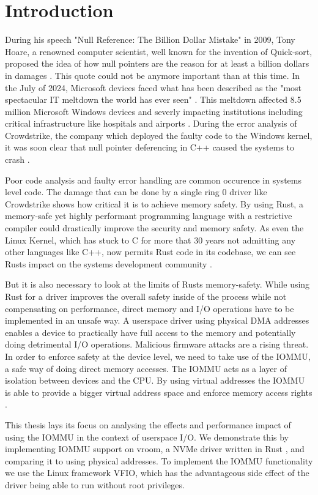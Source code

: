 \chapter{Introduction}\label{c:introduction}

During his speech "Null Reference: The Billion Dollar Mistake" in 2009, Tony Hoare, a renowned computer scientist, well known for the invention of Quick-sort, proposed the idea of how null pointers are the reason for at least a billion dollars in damages \cite{billiondollarmistake}. This quote could not be anymore important than at this time. In the July of 2024, Microsoft devices faced what has been described as the "most spectacular IT meltdown the world has ever seen" \cite{bloombergmeltdown}. This meltdown affected 8.5 million Microsoft Windows devices and severly impacting institutions including critical infrastructure like hospitals and airports \cite{bloomberg8milliondevices}. During the error analysis of Crowdstrike, the company which deployed the faulty code to the Windows kernel, it was soon clear that null pointer deferencing in C++ caused the systems to crash \cite{heisenullpointer}.

Poor code analysis and faulty error handling are common occurence in systems level code. The damage that can be done by a single ring 0 driver like Crowdstrike shows how critical it is to achieve memory safety. By using Rust, a memory-safe yet highly performant programming language with a restrictive compiler could drastically improve the security and memory safety. As even the Linux Kernel, which has stuck to C for more that 30 years not admitting any other languages like C++, now permits Rust code in its codebase, we can see Rusts impact on the systems development community \cite{linuxrustpull}.

But it is also necessary to look at the limits of Rusts memory-safety. While using Rust for a driver improves the overall safety inside of the process while not compensating on performance, direct memory and I/O operations have to be implemented in an unsafe way. A userspace driver using physical DMA addresses enables a device to practically have full access to the memory and potentially doing detrimental I/O operations. Malicious firmware attacks are a rising threat.
In order to enforce safety at the device level, we need to take use of the IOMMU, a safe way of doing direct memory accesses. The IOMMU acts as a layer of isolation between devices and the CPU. By using virtual addresses the IOMMU is able to provide a bigger virtual address space and enforce memory access rights \cite{OLS2007}.

This thesis lays its focus on analysing the effects and performance impact of using the IOMMU in the context of userspace I/O.
We demonstrate this by implementing IOMMU support on vroom, a NVMe driver written in Rust \cite{vroom}, and comparing it to using physical addresses. To implement the IOMMU functionality we use the Linux framework VFIO, which has the advantageous side effect of the driver being able to run without root privileges.
